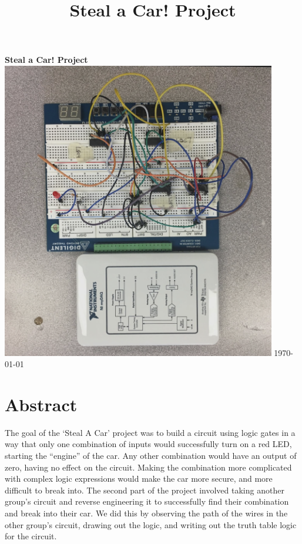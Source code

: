 \documentclass{article}
\begin{document}
\begin{titlepage}
\begin{center}
   \vspace{5cm}
       \large
       \textbf{Steal a Car! Project}\break\break
        \includegraphics[width=0.9\textwidth]{circuit.png}\break\break
        \break
        \break
        \break
        \text\today\break
    \end{center}
\end{titlepage}

\title{Steal a Car! Project}
\tableofcontents

\newpage

\section{Abstract}

The goal of the ‘Steal A Car’ project was to build a circuit using logic gates in a way that only one combination of inputs would successfully turn on a red LED, starting the “engine” of the car. Any other combination would have an output of zero, having no effect on the circuit. Making the combination more complicated with complex logic expressions would make the car more secure, and more difficult to break into. The second part of the project involved taking another group’s circuit and reverse engineering it to successfully find their combination and break into their car. We did this by observing the path of the wires in the other group’s circuit, drawing out the logic, and writing out the truth table logic for the circuit.
\end{document}
